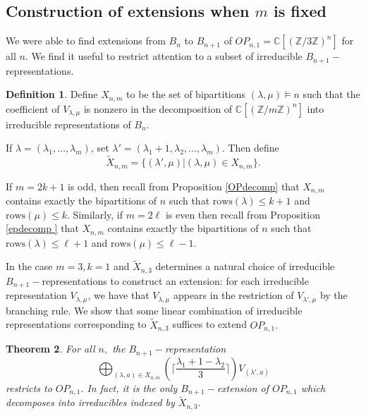 \documentclass{amsart}
\theoremstyle{plain}
\newtheorem{theorem}{Theorem}[section]
\theoremstyle{definition}
\newtheorem{definition}[theorem]{Definition}
\newcommand{\C}{\mathbb{C}}
\newcommand{\Z}{\mathbb{Z}}
\begin{document}
\subsection{Construction of extensions when $m$ is fixed}

We were able to find extensions from $B_n$ to $B_{n+1}$ of $OP_{n,1}= \C[(\Z/3\Z)^n]$ for all $n.$ We find it useful to restrict attention to a subset of irreducible  $B_{n+1}-$representations. 

\begin{definition}
Define $X_{n,m}$ to be the set of bipartitions $(\lambda,\mu)\vDash n$ such that the coefficient of $V_{\lambda,\mu}$ is nonzero in the decomposition of $\C[(\Z/m\Z)^n]$ into irreducible representations of $B_n.$ 

If $\lambda= (\lambda_1,\dots ,\lambda_m)$, set $\lambda' = (\lambda_1+1 ,\lambda_2,\dots, \lambda_m).$ Then define
$$\tilde{X}_{n,m}= \{ (\lambda',\mu)| (\lambda,\mu)\in X_{n,m}\}.$$

\end{definition}
If $m = 2k + 1$ is odd, then recall from Proposition \ref{OPdecomp} that $X_{n,m}$ contains exactly the  bipartitions of $n$ such that $\mathrm{rows}(\lambda)\le k+1$ and $\mathrm{rows}(\mu)\le k$. Similarly, if $m = 2\ell$ is even then recall from Proposition \ref{epdecomp } that $X_{n,m}$ contains exactly the bipartitions of $n$ such that $\mathrm{rows}(\lambda)\le \ell +1$ and $\mathrm{rows}(\mu)\le \ell -1$.

In the case $m=3, k=1$ and $\tilde{X}_{n,3}$ determines a natural choice of irreducible $B_{n+1}-$representations to construct an extension: for each irreducible representation $V_{\lambda,\mu}$, we have that $V_{\lambda,\mu}$ appears in the restriction of $V_{\lambda',\mu}$ by the branching rule. We show that some linear combination of irreducible representations corresponding to $\tilde{X}_{n,3} $ suffices to extend $OP_{n, 1}.$ 
\begin{theorem} \label{thm:OPn1Thm}
For all $n,$ the $B_{n+1}-$representation
$$\bigoplus_{(\lambda,a)\in X_{n,m}}  (\lceil \frac{\lambda_1 + 1 - \lambda_2}{3} \rceil ) V_{(\lambda',a)}$$
restricts to $OP_{n, 1}.$ In fact, it is the only $B_{n+1}-$extension of $OP_{n,1}$ which decomposes into irreducibles indexed by $\tilde{X}_{n,3}.$ 
\end{theorem}
\end{document}
